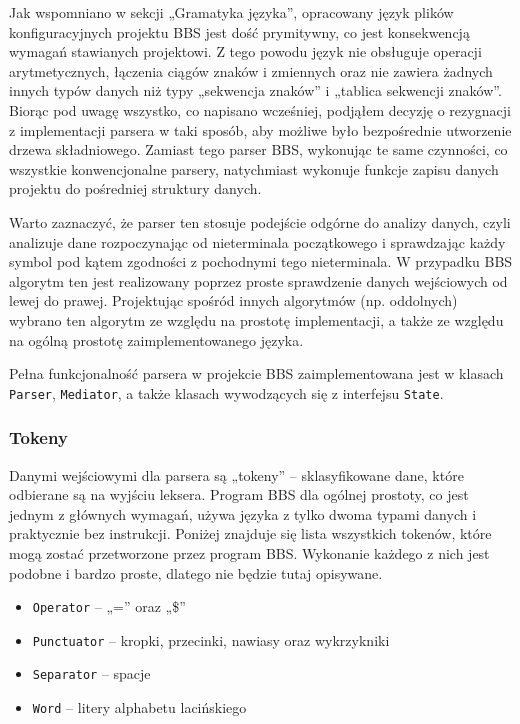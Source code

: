 Jak wspomniano w sekcji „Gramatyka języka”, opracowany język plików konfiguracyjnych projektu BBS jest dość prymitywny, co jest konsekwencją wymagań stawianych projektowi. Z tego powodu język nie obsługuje operacji arytmetycznych, łączenia ciągów znaków i zmiennych oraz nie zawiera żadnych innych typów danych niż typy „sekwencja znaków” i „tablica sekwencji znaków”. Biorąc pod uwagę wszystko, co napisano wcześniej, podjąłem decyzję o rezygnacji z implementacji parsera w taki sposób, aby możliwe było bezpośrednie utworzenie drzewa składniowego. Zamiast tego parser BBS, wykonując te same czynności, co wszystkie konwencjonalne parsery, natychmiast wykonuje funkcje zapisu danych projektu do pośredniej struktury danych.

Warto zaznaczyć, że parser ten stosuje podejście odgórne do analizy danych, czyli analizuje dane rozpoczynając od nieterminala początkowego i sprawdzając każdy symbol pod kątem zgodności z pochodnymi tego nieterminala. W przypadku BBS algorytm ten jest realizowany poprzez proste sprawdzenie danych wejściowych od lewej do prawej. Projektując spośród innych algorytmów (np. oddolnych) wybrano ten algorytm ze względu na prostotę implementacji, a także ze względu na ogólną prostotę zaimplementowanego języka.

Pełna funkcjonalność parsera w projekcie BBS zaimplementowana jest w klasach \texttt{Parser}, \texttt{Mediator}, a także klasach wywodzących się z interfejsu \texttt{State}.

\subsubsection{Tokeny}

Danymi wejściowymi dla parsera są „tokeny” -- sklasyfikowane dane, które odbierane są na wyjściu leksera. Program BBS dla ogólnej prostoty, co jest jednym z głównych wymagań, używa języka z tylko dwoma typami danych i praktycznie bez instrukcji. Poniżej znajduje się lista wszystkich tokenów, które mogą zostać przetworzone przez program BBS. Wykonanie każdego z nich jest podobne i bardzo proste, dlatego nie będzie tutaj opisywane.

\begin{itemize}
	\item \texttt{Operator} -- „=” oraz „\$”
	\item \texttt{Punctuator} -- kropki, przecinki, nawiasy oraz wykrzykniki
	\item \texttt{Separator} -- spacje
	\item \texttt{Word} -- litery alphabetu lacińskiego
\end{itemize}

